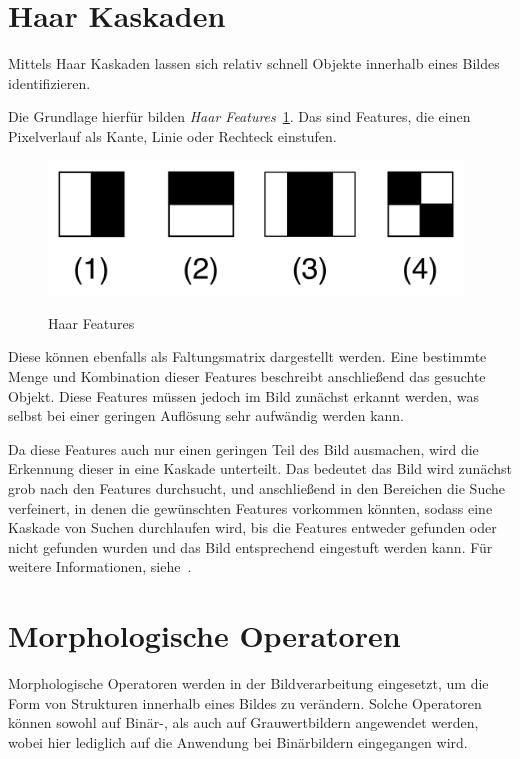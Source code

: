 \section{Haar Kaskaden} %
Mittels Haar Kaskaden lassen sich relativ schnell Objekte innerhalb eines Bildes identifizieren.

Die Grundlage hierfür bilden {\em Haar Features}~\ref{fig:Haar}.
Das sind Features, die einen Pixelverlauf als Kante, Linie oder Rechteck einstufen.

\begin{figure}[ht]
   \centering
     \includegraphics[width=11cm]{Bilder/Haar} \\
 \caption{Haar Features}
 \label{fig:Haar}
\end{figure}

Diese können ebenfalls als Faltungsmatrix dargestellt werden.
Eine bestimmte Menge und Kombination dieser Features beschreibt anschließend das gesuchte Objekt.
Diese Features müssen jedoch im Bild zunächst erkannt werden, was selbst bei einer geringen Auflösung sehr aufwändig werden kann.

Da diese Features auch nur einen geringen Teil des Bild ausmachen, wird die Erkennung dieser in eine Kaskade unterteilt. Das bedeutet das Bild wird zunächst grob nach den Features durchsucht, und anschließend in den Bereichen die Suche verfeinert, in denen die gewünschten Features vorkommen könnten, sodass eine Kaskade von Suchen durchlaufen wird, bis die Features entweder gefunden oder nicht gefunden wurden und das Bild entsprechend eingestuft werden kann.
Für weitere Informationen, siehe~\cite{haar}.

\section{Morphologische Operatoren} %
\label{sec:MorphologischeOperatoren}
Morphologische Operatoren werden in der Bildverarbeitung eingesetzt, um die Form von Strukturen innerhalb eines Bildes zu verändern.
Solche Operatoren können sowohl auf Binär-, als auch auf Grauwertbildern angewendet werden, wobei hier lediglich auf die Anwendung bei Binärbildern
eingegangen wird.

